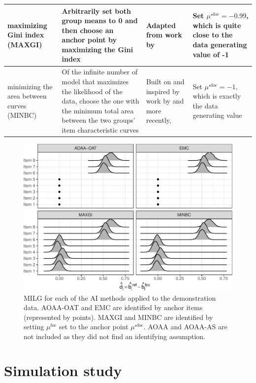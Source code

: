 \documentclass[
  11pt,
]{article}
\begin{document}
\begin{table}[H]
\begin{tabular}{|p{3cm}|p{4cm}|p{3cm}|p{3cm}|}
maximizing Gini index (MAXGI) & Arbitrarily set both group means to 0 and then choose an anchor point by maximizing the Gini index & Adapted from work by \cite{strobl2018anchor} & Set $\mu^{\star\text{foc}} = -0.99$, which is quite close to the data generating value of -1 \\\hline

minimizing the area between curves (MINBC) & Of the infinite number of model that maximizes the likelihood of the data, choose the one with the minimum total area between the two groups' item characteristic curves & Built on and inspired by work by \cite{raju1988area} and more recently, \cite{chalmers2016might} & Set $\mu^{\star\text{foc}} = -1$, which is exactly the data generating value\\

\bottomrule
\end{tabular}
\label{table:allmethods}
\end{table}

\begin{figure}[H]

{\centering \includegraphics[width=0.7\linewidth]{paper_files/figure-latex/allmethodsfig-1} 

}

\caption{MILG for each of the AI methods applied to the demonstration data. AOAA-OAT and EMC are identified by anchor items (represented by points). MAXGI and MINBC are identified by setting $\mu^{\text{foc}}$ set to the anchor point $\mu^{\star\text{foc}}$. AOAA and AOAA-AS are not included as they did not find an identifying assumption.}\label{fig:allmethodsfig}
\end{figure}

\hypertarget{simstudy}{%
\section{Simulation study}\label{simstudy}}
\end{document}
